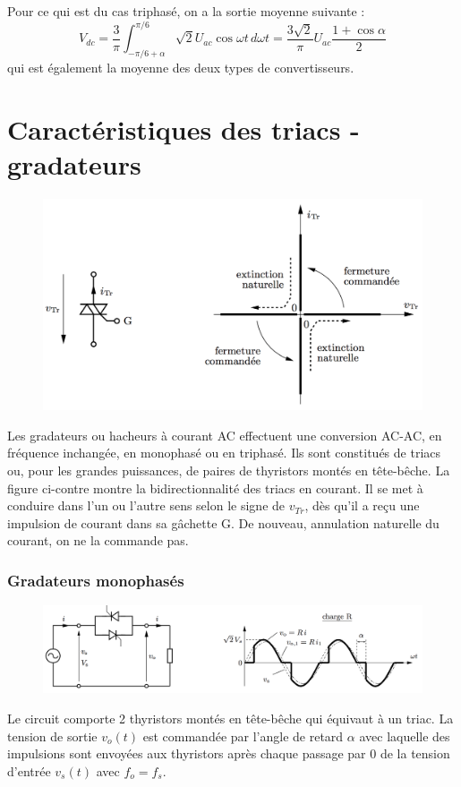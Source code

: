 		Pour ce qui est du cas triphasé, on a la sortie moyenne suivante : 
		\begin{equation}
			V_{dc} = \frac{3}{\pi} \int _{-\pi /6 + \alpha}^{\pi /6} \sqrt{2} U_{ac} \cos \omega t \, d\omega t = \frac{3\sqrt{2}}{\pi}U_{ac} \frac{1+\cos \alpha}{2}
		\end{equation}
		qui est également la moyenne des deux types de convertisseurs. 
		
	\section{Caractéristiques des triacs - gradateurs}
		\begin{figure}
		\vspace{-5mm}
		\includegraphics[scale=0.28]{ch3/12}
		\label{fig:3.12}
		\end{figure}
		Les gradateurs ou hacheurs à courant AC effectuent une conversion AC-AC, en fréquence inchangée, en monophasé ou en triphasé. Ils sont constitués de triacs ou, pour les grandes puissances, de paires de thyristors montés en tête-bêche. La figure ci-contre montre la bidirectionnalité des triacs en courant. Il se met à conduire dans l'un ou l'autre sens selon le signe de $v_{Tr}$, dès qu'il a reçu une impulsion de courant dans sa gâchette G. De nouveau, annulation naturelle du courant, on ne la commande pas. 
		
			\subsubsection{Gradateurs monophasés}
		 	\begin{figure}
			\vspace{-5mm}
			\includegraphics[scale=0.28]{ch3/13}
			\label{fig:3.13}
			\end{figure}
			Le circuit comporte 2 thyristors montés en tête-bêche qui équivaut à un triac. La tension de sortie $v_o(t)$ est commandée par l'angle de retard $\alpha$ avec laquelle des impulsions sont envoyées aux thyristors après chaque passage par 0 de la tension d'entrée $v_s(t)$ avec $f_o = f_s$. 
			
